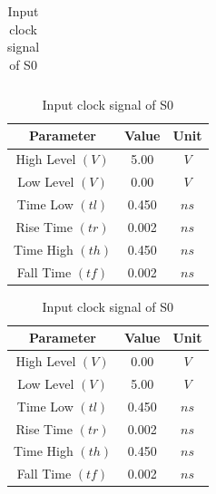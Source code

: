 \documentclass[a4paper,12pt]{article}
\begin{document}
\begin{table}[H]
\begin{subtable}[t]{0.48\textwidth}
\begin{tabular}{|c|c|c|}
			\end{tabular}
			\caption{Input clock signals for C \& D} %
		\end{subtable}
			\begin{subtable}[t]{0.48\textwidth} %
			\centering
			\begin{tabular}{|c|c|c|}
				\hline
				\textbf{Parameter}          & \textbf{Value} & \textbf{Unit} \\ \hline
				High Level $(V)$            & 5.00           & $V$           \\ \hline
				Low Level $(V)$             & 0.00           & $V$           \\ \hline
				Time Low $(tl)$             & 0.450         & $ns$          \\ \hline
				Rise Time $(tr)$            & 0.002          & $ns$          \\ \hline
				Time High $(th)$            & 0.450          & $ns$          \\ \hline
				Fall Time $(tf)$            & 0.002          & $ns$          \\ \hline
			\end{tabular}
			
			\caption{Input clock signal of S0} %
		\end{subtable}
		\hfil
		\begin{subtable}[t]{0.48\textwidth} %
			\centering
			\begin{tabular}{|c|c|c|}
				\hline
				\textbf{Parameter}          & \textbf{Value} & \textbf{Unit} \\ \hline
				High Level $(V)$            & 0.00           & $V$           \\ \hline
				Low Level $(V)$             & 5.00           & $V$           \\ \hline
				Time Low $(tl)$             & 0.450          & $ns$          \\ \hline
				Rise Time $(tr)$            & 0.002          & $ns$          \\ \hline
				Time High $(th)$            & 0.450         & $ns$          \\ \hline
				Fall Time $(tf)$            & 0.002          & $ns$          \\ \hline
			\end{tabular}
			

\end{subtable}
\end{table}
\end{document}
